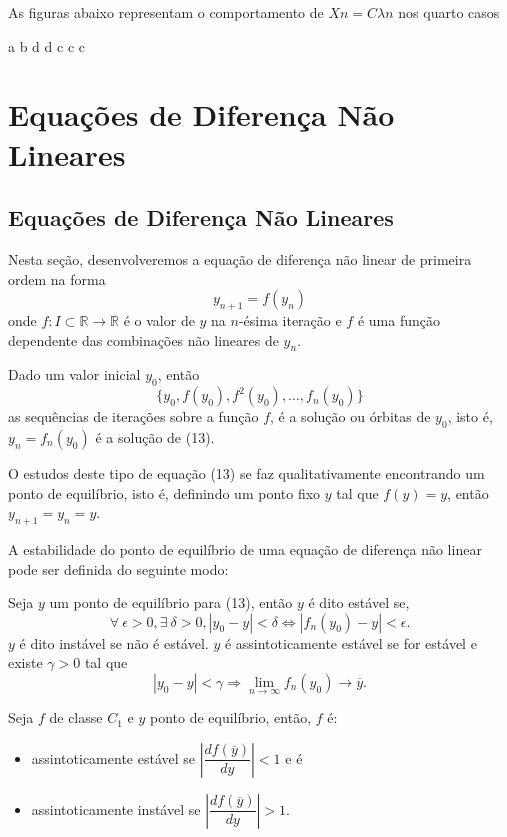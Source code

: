 As figuras abaixo representam o comportamento de $Xn = C\lambda n$ nos quarto casos

a 
b 
d 
d 
c 
c 
c 

\chapter{Equações de Diferença Não Lineares}



\section{Equações de Diferença Não Lineares}

Nesta seção, desenvolveremos a equação de diferença não linear de primeira ordem na forma 
\begin{equation}
y_{n+1} = f(y_n) %
\end{equation}
onde $f: I \subset \mathbb{R} \to \mathbb{R}$ é o valor de $y$ na $n$-ésima iteração e $f$ é uma função dependente das combinações não lineares de $y_n$.

Dado um valor inicial $y_0$, então
$$\{y_0,f(y_0),f^{2}(y _{0}), \ldots, f_{n}(y_{0})\}$$
as sequências de iterações sobre a função $f$, é a solução ou órbitas de $y_0$, isto é, $y_{n} = f_{n}(y_{0})$ é a solução de (13).

O estudos deste tipo de equação (13) se faz qualitativamente encontrando um ponto de equilíbrio, isto é, definindo um ponto fixo $y$ tal que $f(y) = y$, então 
$y_{n+1} = y_{n} = y$.

A estabilidade do ponto de equilíbrio de uma equação de diferença não linear pode ser definida do seguinte modo: 

\begin{definition}
Seja $y$ um ponto de equilíbrio para (13), então $y$ é dito estável se, 
$$\forall\ \epsilon > 0,\exists\ \delta  > 0,|y_0 - y| < \delta \Leftrightarrow |f_{n}(y_0) - y| < \epsilon.$$ $y$ é dito instável se não é estável. $y$ é assintoticamente estável se for estável e existe $\gamma  > 0$ tal que 
$$|y_0 - y| < \gamma  \Rightarrow  \lim_{n \to \infty} f_{n}(y_0) \to \overline{y}.$$
\end{definition}

\begin{teorema}
Seja $f$ de classe $C_1$ e $y$ ponto de equilíbrio, então, $f$ é:

\begin{itemize}
\item assintoticamente estável se $\left|\dfrac{df(\overline{y})}{dy}\right| < 1$ e é
\item assintoticamente instável se $\left|\dfrac{df(\overline{y})}{dy}\right| > 1$.
\end{itemize}
\end{teorema}

